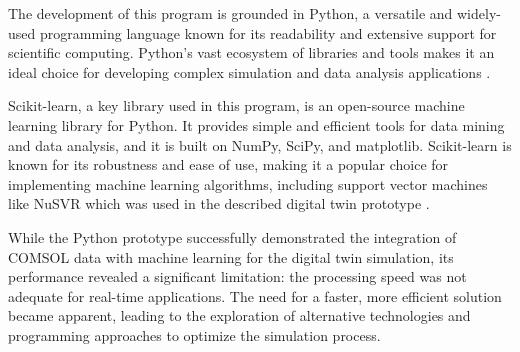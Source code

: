 The development of this program is grounded in Python, a versatile and
widely-used programming language known for its readability and extensive
support for scientific computing. Python's vast ecosystem of libraries and
tools makes it an ideal choice for developing complex simulation and data
analysis applications \cite{python2021python}.

Scikit-learn, a key library used in this program, is an open-source machine
learning library for Python. It provides simple and efficient tools for data
mining and data analysis, and it is built on NumPy, SciPy, and matplotlib.
Scikit-learn is known for its robustness and ease of use, making it a popular
choice for implementing machine learning algorithms, including support vector
machines like NuSVR which was used in the described digital twin prototype
\cite{kramer2016scikit}.

While the Python prototype successfully demonstrated the integration of COMSOL
data with machine learning for the digital twin simulation, its performance
revealed a significant limitation: the processing speed was not adequate for
real-time applications. The need for a faster, more efficient solution became
apparent, leading to the exploration of alternative technologies and
programming approaches to optimize the simulation process.
